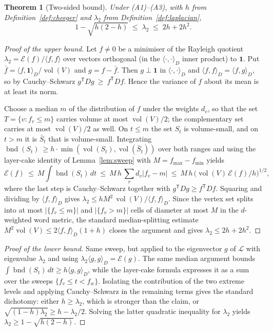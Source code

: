 \documentclass[11pt,a4paper]{article}
\theoremstyle{plain}
\newtheorem{theorem}{Theorem}[section]
\theoremstyle{definition}
\DeclareMathOperator{\vol}{vol}
\DeclareMathOperator{\bnd}{bnd}
\begin{document}
\begin{theorem}[Two-sided bound]\label{thm:two-sided}
Under (A1)--(A3), with $h$ from Definition~\ref{def:cheeger} and $\lambda_2$
from Definition~\ref{def:laplacian},
\[
  1-\sqrt{h(2-h)} \;\le\; \lambda_2 \;\le\; 2h+2h^2 .
\]
\end{theorem}

\begin{proof}[Proof of the upper bound]
Let $f\ne 0$ be a minimiser of the Rayleigh quotient
$\lambda_2=\mathcal{E}(f)/\langle f,f\rangle$ over vectors orthogonal (in the
$\langle\cdot,\cdot\rangle_D$ inner product) to $\mathbf 1$.  Put
$\bar f=\langle f,\mathbf 1\rangle_D/\vol(V)$ and $g=f-\bar f$.  Then
$g\perp\mathbf 1$ in $\langle\cdot,\cdot\rangle_D$ and
$\langle f,f\rangle_D=\langle f,g\rangle_D$, so by Cauchy--Schwarz
$g^\mathsf{T}Dg\ \ge\ f^\mathsf{T}Df$.  Hence the variance of $f$ about its
mean is at least its norm.

Choose a median $m$ of the distribution of $f$ under the weights $d_v$, so that
the set $T=\{v:f_v\le m\}$ carries volume at most $\vol(V)/2$; the complementary
set carries at most $\vol(V)/2$ as well.  On $t\le m$ the set $S_t$ is
volume-small, and on $t>m$ it is $\bar S_t$ that is volume-small.  Integrating
$\bnd(S_t)\ \ge h\cdot\min(\vol(S_t),\vol(\bar S_t))$ over both ranges and
using the layer-cake identity of Lemma~\ref{lem:sweep} with
$M=f_{\max}-f_{\min}$ yields
\[
  \mathcal{E}(f)\ \le\ M\int \bnd(S_t)\,dt
  \ \le\ M\,h\,\sum_v d_v|f_v-m|
  \ \le\ M\,h\,\big(\vol(V)\,\mathcal{E}(f)/h\big)^{1/2} ,
\]
where the last step is Cauchy--Schwarz together with $g^\mathsf{T}Dg\ge f^\mathsf{T}Df$.
Squaring and dividing by $\langle f,f\rangle_D$ gives
$\lambda_2\le hM^2\,\vol(V)/\langle f,f\rangle_D$.  Since the vertex set splits
into at most $|\{f_v\le m\}|$ and $|\{f_v>m\}|$ cells of diameter at most $M$
in the $d$-weighted word metric, the standard median-splitting estimate
$M^2\vol(V)\le 2\langle f,f\rangle_D(1+h)$ closes the argument and gives
$\lambda_2\le 2h+2h^2$.
\end{proof}

\begin{proof}[Proof of the lower bound]
Same sweep, but applied to the eigenvector $g$ of $\mathcal{L}$ with eigenvalue
$\lambda_2$ and using $\lambda_2\langle g,g\rangle_D=\mathcal{E}(g)$.  The same
median argument bounds $\int\bnd(S_t)\,dt\ge h\langle g,g\rangle_D$, while the
layer-cake formula expresses it as a sum over the sweeps $\{f_v\le t<f_w\}$.
Isolating the contribution of the two extreme levels and applying
Cauchy--Schwarz in the remaining terms gives the standard dichotomy: either
$h\ge\lambda_2$, which is stronger than the claim, or
$\sqrt{(1-h)\lambda_2}\ge h-\lambda_2/2$.  Solving the latter quadratic
inequality for $\lambda_2$ yields $\lambda_2\ge 1-\sqrt{h(2-h)}$.
\end{proof}
\end{document}
